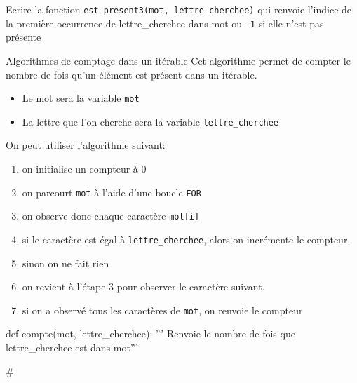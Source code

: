 		\begin{exercice_cours}{		Ecrire la fonction \texttt{est\_present3(mot, lettre\_cherchee)} qui renvoie l'indice de la première occurrence de lettre\_cherchee dans mot ou \texttt{-1} si elle n'est pas présente}{}

		\end{exercice_cours}

	\begin{easybox}{Algorithmes de comptage dans un itérable}
Cet algorithme permet de compter le nombre de fois qu'un élément est présent dans un itérable.
			\begin{itemize}

				\item Le mot sera la variable \verb|mot|
				\item La lettre que l'on cherche sera la variable \verb|lettre_cherchee|
			\end{itemize}

			On peut utiliser l'algorithme suivant:
			
	\begin{enumerate}
		\item on initialise un compteur à 0
		\item on parcourt \verb|mot| à l'aide d'une boucle \verb|FOR|
		\item on observe donc chaque caractère \verb|mot[i]|
		\item si le caractère est égal à \verb|lettre_cherchee|, alors on incrémente le compteur.
		\item sinon on ne fait rien 
		\item on revient à l'étape 3 pour observer le caractère suivant.
		\item si on a observé tous les caractères de \verb|mot|, on renvoie le compteur
	\end{enumerate}
		

	\end{easybox}

	\begin{exercice_cours}{}	
		\begin{CodePythontexAlt}[Largeur=1\linewidth,Centre,PremLigne=1, Lignes=false,]{}
			def compte(mot, lettre_cherchee):
				''' Renvoie le nombre de fois que lettre_cherchee est dans mot'''








				#
				
			\end{CodePythontexAlt}
	\end{exercice_cours}

